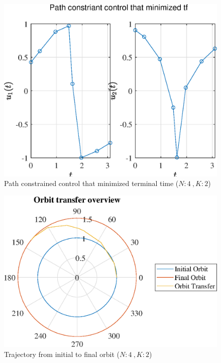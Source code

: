 \documentclass[]{article}
\begin{document}
	\begin{figure}
		\centering
		\includegraphics[scale=0.75]{path_N4_K2_C3_tf.eps}
		\caption{Path constrained control that minimized terminal time (\(N:4\ , K:2\))}
		\label{fig:path_N4_K2_C3_tf}
	\end{figure}
	\begin{figure}
		\centering
		\includegraphics[scale=0.75]{orbit_N4_K2_C3_tf.eps}
		\caption{Trajectory from initial to final orbit (\(N:4\ , K:2\))}
		\label{fig:orbit_N4_K2_C3_tf}
	\end{figure}
\end{document}
